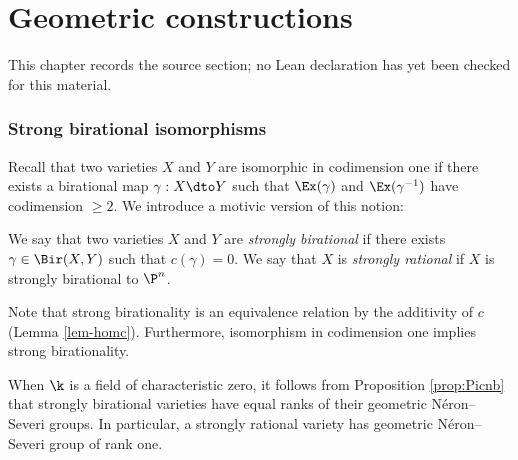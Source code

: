 \chapter{Geometric constructions}
\label{motivic-invariants-birational-maps-chapter-03}

\begin{remark}
\label{motivic-invariants-birational-maps-chapter-03-source}
This chapter records the source section; no Lean declaration has yet been checked for this material.
\notready
\end{remark}

\label{sec:geometric-constructions}



\subsection{Strong birational isomorphisms}


Recall that two varieties $X$ and $Y$ are isomorphic
in codimension one if there exists a birational
map $\gamma: X \dto Y$ such that
$\Ex(\gamma)$ and $\Ex(\gamma^{-1})$ have codimension $\ge 2$.
We introduce a motivic version of this notion:

\begin{definition}
\notready\label{def:strong-birat}
We say that two varieties
$X$ and $Y$ are {\it strongly
birational}
if there exists $\gamma \in \Bir(X,Y)$
such that
$c(\gamma) = 0$.
We say that $X$ is
{\it strongly rational}
if $X$ is strongly birational to $\P^n$.
\end{definition}

Note that strong birationality
is an equivalence relation by the
additivity of $c$ (Lemma \ref{lem-homc}).
Furthermore, isomorphism in codimension one
implies strong birationality.




When $\k$ is a field of characteristic zero,
it follows from Proposition
\ref{prop:Picnb} that strongly birational varieties
have equal ranks of their
geometric N\'eron--Severi groups.
In particular, a strongly rational
variety has geometric N\'eron--Severi group
 of
rank one.

